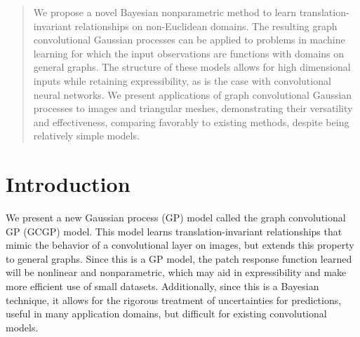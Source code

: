 \documentclass{article}
\begin{document}





\printAffiliationsAndNotice{}  

\begin{abstract}
We propose a novel Bayesian nonparametric method to learn translation-invariant relationships on non-Euclidean domains. The resulting graph convolutional Gaussian processes can be applied to problems in machine learning for which the input observations are functions with domains on general graphs. The structure of these models allows for high dimensional inputs while retaining expressibility, as is the case with convolutional neural networks. We present applications of graph convolutional Gaussian processes to images and triangular meshes, demonstrating their versatility and effectiveness, comparing favorably to existing methods, despite being relatively simple models.
\end{abstract}

\section{Introduction}

We present a new Gaussian process (GP) model called the graph convolutional GP (GCGP) model. This model learns translation-invariant relationships that mimic the behavior of a convolutional layer on images, but extends this property to general graphs. Since this is a GP model, the patch response function learned will be nonlinear and nonparametric, which may aid in expressibility and make more efficient use of small datasets. Additionally, since this is a Bayesian technique, it allows for the rigorous treatment of uncertainties for predictions, useful in many application domains, but difficult for existing convolutional models.
\end{document}
